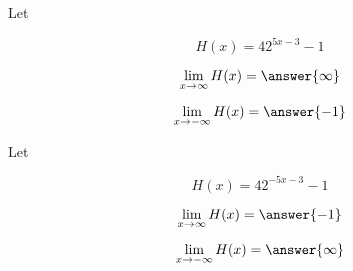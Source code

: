 \documentclass{ximera}
\author{Lee Wayand}
\begin{document}
\begin{exercise}


\begin{question}



Let 

\[
H(x) = 4 2^{5x - 3} - 1
\]



\[
\lim\limits_{x \to \infty} H(x) = \answer{\infty}
\]



\[
\lim\limits_{x \to -\infty} H(x) = \answer{-1}
\]

\end{question}







\begin{question}



Let 

\[
H(x) = 4 2^{-5x - 3} - 1
\]


\[
\lim\limits_{x \to \infty} H(x) = \answer{-1}
\]



\[
\lim\limits_{x \to -\infty} H(x) = \answer{\infty}
\]

\end{question}













\end{exercise}
\end{document}
